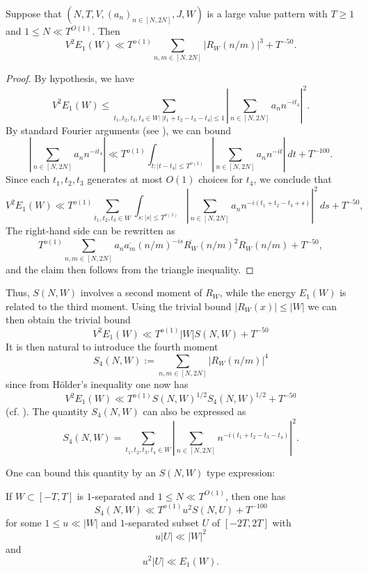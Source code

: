 \begin{lemma}\label{energy-third} Suppose that $(N,T,V,(a_n)_{n \in [N,2N]},J,W)$ is a large value pattern with $T \geq 1$ and $1 \leq N \ll T^{O(1)}$.  Then
$$ V^2 E_1(W) \ll T^{o(1)} \sum_{n,m \in [N,2N]} |R_W(n/m)|^3 + T^{-50}.$$
\end{lemma}

\begin{proof} By hypothesis, we have
$$ V^2 E_1(W) \leq \sum_{t_1,t_2,t_3,t_4 \in W: |t_1+t_2-t_3-t_4| \leq 1} \left|\sum_{n \in [N,2N]} a_n n^{-it_4} \right|^2.$$
By standard Fourier arguments (see \cite[Lemma 11.3]{guth-maynard}), we can bound
$$ \left|\sum_{n \in [N,2N]} a_n n^{-it_4}\right| \ll T^{o(1)} \int_{t: |t-t_4| \leq T^{o(1)}} \left|\sum_{n \in [N,2N]} a_n n^{-it}\right|\ dt + T^{-100}.$$
Since each $t_1,t_2,t_3$ generates at most $O(1)$ choices for $t_4$, we conclude that
$$ V^2 E_1(W) \ll T^{o(1)} \sum_{t_1,t_2,t_3 \in W} \int_{s: |s| \leq T^{o(1)}}  \left|\sum_{n \in [N,2N]} a_n n^{-i(t_1+t_2-t_3+s)} \right|^2\ ds + T^{-50},$$
The right-hand side can be rewritten as
$$ T^{o(1)} \sum_{n,m \in [N,2N]} a_n \overline{a_m} (n/m)^{-is} \overline{R_W}(n/m)^2 R_W(n/m) + T^{-50},$$
and the claim then follows from the triangle inequality.
\end{proof}

Thus, $S(N,W)$ involves a second moment of $R_W$, while the energy $E_1(W)$ is related to the third moment.  Using the trivial bound $|R_W(x)| \leq |W|$ we can then obtain the trivial bound
\begin{equation}\label{energy-triv}
V^2 E_1(W) \ll T^{o(1)} |W| S(N,W) + T^{-50}
\end{equation}
It is then natural to introduce the fourth moment
$$ S_4(N,W) := \sum_{n,m \in [N,2N]} |R_W(n/m)|^4$$
since from H\"older's inequality one now has
\begin{equation}\label{v1w}
    V^2 E_1(W) \ll T^{o(1)} S(N,W)^{1/2} S_4(N,W)^{1/2} + T^{-50}
\end{equation}
(cf. \cite[Lemma 3]{heath_brown_consecutive_II}).  The quantity $S_4(N,W)$ can also be expressed as
$$ S_4(N,W) = \sum_{t_1,t_2,t_3,t_4 \in W} \left|\sum_{n \in [N,2N]} n^{-i(t_1+t_2-t_3-t_4)}\right|^2.$$

One can bound this quantity by an $S(N,W)$ type expression:

\begin{lemma}\label{wtu} If $W \subset [-T,T]$ is $1$-separated and $1 \leq N \ll T^{O(1)}$, then one has
$$ S_4(N,W) \ll T^{o(1)} u^2 S(N,U) + T^{-100}$$
for some $1 \leq u \ll |W|$ and $1$-separated subset $U$ of $[-2T,2T]$ with
\begin{equation}\label{v1}
 u |U| \ll |W|^2
\end{equation}
and
\begin{equation}\label{v2}
     u^2 |U| \ll E_1(W).
\end{equation}
\end{lemma}

